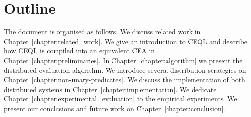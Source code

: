 \section{Outline}
\label{sec:outline}

The document is organised as follows. We discuss related work in Chapter~\ref{chapter:related_work}. We give an introduction to CEQL and describe how CEQL is compiled into an equivalent CEA in Chapter~\ref{chapter:preliminaries}. In Chapter~\ref{chapter:algorithm} we present the distributed evaluation algorithm. We introduce several distribution strategies on Chapter~\ref{chapter:non-unary-predicates}. We discuss the implementation of both distributed systems in Chapter~\ref{chapter:implementation}. We dedicate Chapter~\ref{chapter:experimental_evaluation} to the empirical experiments. We present our conclusions and future work on Chapter~\ref{chapter:conclusion}.
